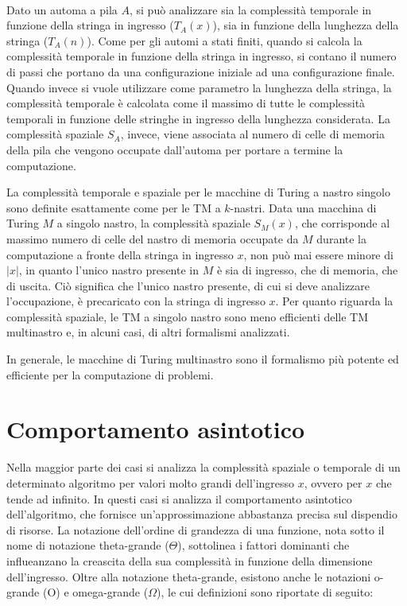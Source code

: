   \paragraph{}
  Dato un automa a pila \(A\), si può analizzare sia la complessità temporale in funzione della stringa in ingresso (\({T}_A(x)\)), sia in funzione della lunghezza della stringa (\({T}_A(n)\)). Come per gli automi a stati finiti, quando si calcola la complessità temporale in funzione della stringa in ingresso, si contano il numero di passi che portano da una configurazione iniziale ad una configurazione finale. Quando invece si vuole utilizzare come parametro la lunghezza della stringa, la complessità temporale è calcolata come il massimo di tutte le complessità temporali in funzione delle stringhe in ingresso della lunghezza considerata. La complessità spaziale \({S}_A\), invece, viene associata al numero di celle di memoria della pila che vengono occupate dall'automa per portare a termine la computazione.

  \vspace*{10px}

  La complessità temporale e spaziale per le macchine di Turing a nastro singolo sono definite esattamente come per le TM a \(k\)-nastri. Data una macchina di Turing \(M\) a singolo nastro, la complessità spaziale \({S}_M(x)\), che corrisponde al massimo numero di celle del nastro di memoria occupate da \(M\) durante la computazione a fronte della stringa in ingresso \(x\), non può mai essere minore di \(|x|\), in quanto l'unico nastro presente in \(M\) è sia di ingresso, che di memoria, che di uscita. Ciò significa che l'unico nastro presente, di cui si deve analizzare l'occupazione, è precaricato con la stringa di ingresso \(x\). Per quanto riguarda la complessità spaziale, le TM a singolo nastro sono meno efficienti delle TM multinastro e, in alcuni casi, di altri formalismi analizzati. 
  
  In generale, le macchine di Turing multinastro sono il formalismo più potente ed efficiente per la computazione di problemi.


  \section{Comportamento asintotico}
  Nella maggior parte dei casi si analizza la complessità spaziale o temporale di un determinato algoritmo per valori molto grandi dell'ingresso \(x\), ovvero per \(x\) che tende ad infinito. In questi casi si analizza il comportamento asintotico dell'algoritmo, che fornisce un'approssimazione abbastanza precisa sul dispendio di risorse. La notazione dell'ordine di grandezza di una funzione, nota sotto il nome di notazione theta-grande (\(\Theta \)), sottolinea i fattori dominanti che influeanzano la creascita della sua complessità in funzione della dimensione dell'ingresso. Oltre alla notazione theta-grande, esistono anche le notazioni o-grande (O) e omega-grande (\(\Omega \)), le cui definizioni sono riportate di seguito:

